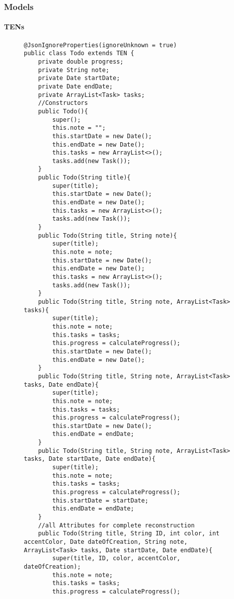 	\subsubsection{Models}
		\paragraph{TENs}	
\begin{figure}[H]
\begin{lstlisting}[caption=Todo (Joscha Nassenstein)]
@JsonIgnoreProperties(ignoreUnknown = true)
public class Todo extends TEN {
    private double progress;
    private String note;
    private Date startDate;
    private Date endDate;
    private ArrayList<Task> tasks;
    //Constructors
    public Todo(){
        super();
        this.note = "";
        this.startDate = new Date();
        this.endDate = new Date();
        this.tasks = new ArrayList<>();
        tasks.add(new Task());
    }
    public Todo(String title){
        super(title);
        this.startDate = new Date();
        this.endDate = new Date();
        this.tasks = new ArrayList<>();
        tasks.add(new Task());
    }
    public Todo(String title, String note){
        super(title);
        this.note = note;
        this.startDate = new Date();
        this.endDate = new Date();
        this.tasks = new ArrayList<>();
        tasks.add(new Task());
    }
    public Todo(String title, String note, ArrayList<Task> tasks){
        super(title);
        this.note = note;
        this.tasks = tasks;
        this.progress = calculateProgress();
        this.startDate = new Date();
        this.endDate = new Date();
    }
    public Todo(String title, String note, ArrayList<Task> tasks, Date endDate){
        super(title);
        this.note = note;
        this.tasks = tasks;
        this.progress = calculateProgress();
        this.startDate = new Date();
        this.endDate = endDate;
    }
    public Todo(String title, String note, ArrayList<Task> tasks, Date startDate, Date endDate){
        super(title);
        this.note = note;
        this.tasks = tasks;
        this.progress = calculateProgress();
        this.startDate = startDate;
        this.endDate = endDate;
    }
    //all Attributes for complete reconstruction
    public Todo(String title, String ID, int color, int accentColor, Date dateOfCreation, String note, ArrayList<Task> tasks, Date startDate, Date endDate){
        super(title, ID, color, accentColor, dateOfCreation);
        this.note = note;
        this.tasks = tasks;
        this.progress = calculateProgress();

\end{lstlisting}
\end{figure}
